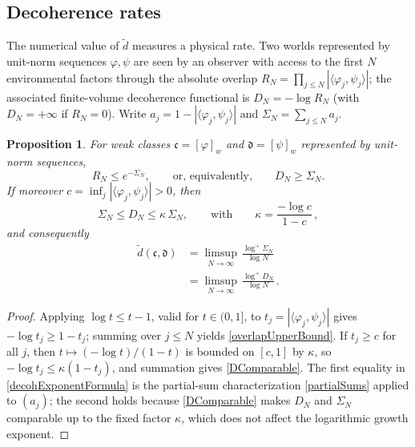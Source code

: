 \documentclass[twoside,11pt,letter]{article}
\def\fc{{\mathfrak{c}}}
\def\fd{{\mathfrak{d}}}
\theoremstyle{definition}
\theoremstyle{definition}
\theoremstyle{plain}
\newtheorem{proposition}[theorem]{Proposition}
\begin{document}
\subsection{Decoherence rates}

The numerical value of $\tilde d$ measures a physical rate. Two worlds represented by unit-norm sequences $\varphi,\psi$ are seen by an observer with access to the first $N$ environmental factors through the absolute overlap $R_N=\prod_{j\leq N}|\langle\varphi_j,\psi_j\rangle|$; the associated finite-volume decoherence functional is $D_N=-\log R_N$ (with $D_N=+\infty$ if $R_N=0$). Write $a_j=1-|\langle\varphi_j,\psi_j\rangle|$ and $\Sigma_N=\sum_{j\leq N}a_j$.

\begin{proposition}\label{decohExpProp}
For weak classes $\fc=[\varphi]_w$ and $\fd=[\psi]_w$ represented by unit-norm sequences,
\begin{equation}\label{overlapUpperBound}
R_N\leq e^{-\Sigma_N},\qquad\text{or, equivalently,}\qquad D_N\geq\Sigma_N.
\end{equation}
If moreover $c=\inf_j|\langle\varphi_j,\psi_j\rangle|>0$, then
\begin{equation}\label{DComparable}
\Sigma_N\leq D_N\leq\kappa\,\Sigma_N,\qquad\text{with}\qquad\kappa=\frac{-\log c}{1-c}\,,
\end{equation}
and consequently
\begin{equation}\label{decohExponentFormula}
\begin{split}
\tilde d(\fc,\fd)&=\limsup_{N\to\infty}\,\frac{\log^+\Sigma_N}{\log N}\\
&=\limsup_{N\to\infty}\,\frac{\log^+D_N}{\log N}\,.
\end{split}
\end{equation}
\end{proposition}
\begin{proof}
Applying $\log t\leq t-1$, valid for $t\in(0,1]$, to $t_j=|\langle\varphi_j,\psi_j\rangle|$ gives $-\log t_j\geq 1-t_j$; summing over $j\leq N$ yields \eqref{overlapUpperBound}. If $t_j\geq c$ for all $j$, then $t\mapsto(-\log t)/(1-t)$ is bounded on $[c,1]$ by $\kappa$, so $-\log t_j\leq\kappa(1-t_j)$, and summation gives \eqref{DComparable}. The first equality in \eqref{decohExponentFormula} is the partial-sum characterization \eqref{partialSums} applied to $(a_j)$; the second holds because \eqref{DComparable} makes $D_N$ and $\Sigma_N$ comparable up to the fixed factor $\kappa$, which does not affect the logarithmic growth exponent.
\end{proof}
\end{document}
